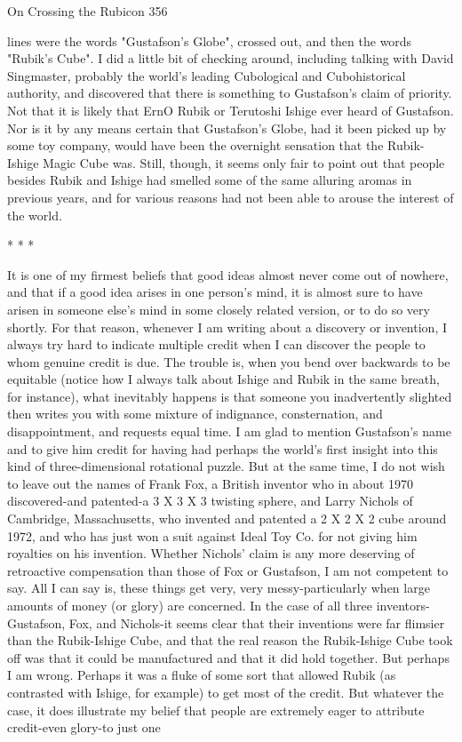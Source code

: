 On Crossing the Rubicon                                                             356

lines were the words "Gustafson's Globe", crossed out, and then the words "Rubik's
Cube".
       I did a little bit of checking around, including talking with David
Singmaster, probably the world's leading Cubological and Cubohistorical
authority, and discovered that there is something to Gustafson's claim of priority.
Not that it is likely that ErnO Rubik or Terutoshi Ishige ever heard of Gustafson.
Nor is it by any means certain that Gustafson's Globe, had it been picked up by
some toy company, would have been the overnight sensation that the Rubik-Ishige
Magic Cube was. Still, though, it seems only fair to point out that people besides
Rubik and Ishige had smelled some of the same alluring aromas in previous years,
and for various reasons had not been able to arouse the interest of the world.

                                      *   *   *

         It is one of my firmest beliefs that good ideas almost never come out of
nowhere, and that if a good idea arises in one person's mind, it is almost sure to
have arisen in someone else's mind in some closely related version, or to do so
very shortly. For that reason, whenever I am writing about a discovery or
invention, I always try hard to indicate multiple credit when I can discover the
people to whom genuine credit is due. The trouble is, when you bend over
backwards to be equitable (notice how I always talk about Ishige and Rubik in the
same breath, for instance), what inevitably happens is that someone you
inadvertently slighted then writes you with some mixture of indignance,
consternation, and disappointment, and requests equal time.
         I am glad to mention Gustafson's name and to give him credit for having
had perhaps the world's first insight into this kind of three-dimensional rotational
puzzle. But at the same time, I do not wish to leave out the names of Frank Fox, a
British inventor who in about 1970 discovered-and patented-a 3 X 3 X 3 twisting
sphere, and Larry Nichols of Cambridge, Massachusetts, who invented and
patented a 2 X 2 X 2 cube around 1972, and who has just won a suit against Ideal
Toy Co. for not giving him royalties on his invention. Whether Nichols' claim is
any more deserving of retroactive compensation than those of Fox or Gustafson, I
am not competent to say.
         All I can say is, these things get very, very messy-particularly when large
amounts of money (or glory) are concerned. In the case of all three inventors-
Gustafson, Fox, and Nichols-it seems clear that their inventions were far flimsier
than the Rubik-Ishige Cube, and that the real reason the Rubik-Ishige Cube took
off was that it could be manufactured and that it did hold together. But perhaps I
am wrong. Perhaps it was a fluke of some sort that allowed Rubik (as contrasted
with Ishige, for example) to get most of the credit. But whatever the case, it does
illustrate my belief that people are extremely eager to attribute credit-even glory-to
just one




